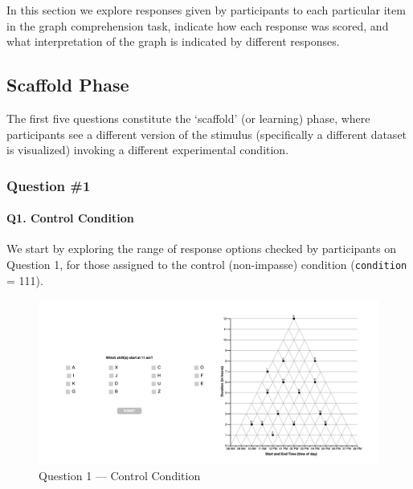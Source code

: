 \documentclass[
  letterpaper,
  DIV=11,
  numbers=noendperiod]{scrreprt}
\let\oldparagraph\paragraph
\renewcommand{\paragraph}[1]{\oldparagraph{#1}\mbox{}}
\begin{document}
In this section we explore responses given by participants to each
particular item in the graph comprehension task, indicate how each
response was scored, and what interpretation of the graph is indicated
by different responses.

\hypertarget{scaffold-phase}{%
\subsection{Scaffold Phase}\label{scaffold-phase}}

The first five questions constitute the `scaffold' (or learning) phase,
where participants see a different version of the stimulus (specifically
a different dataset is visualized) invoking a different experimental
condition.

\hypertarget{question-1}{%
\subsubsection{Question \#1}\label{question-1}}

\hypertarget{q1.-control-condition}{%
\paragraph{Q1. Control Condition}\label{q1.-control-condition}}

We start by exploring the range of response options checked by
participants on Question 1, for those assigned to the control
(non-impasse) condition (\texttt{condition} = 111).

\begin{figure}

{\centering \includegraphics{analysis/SGC3A/static/questions/Q1_111.png}

}

\caption{\label{fig-Q1-111}Question 1 --- Control Condition}

\end{figure}
\end{document}
